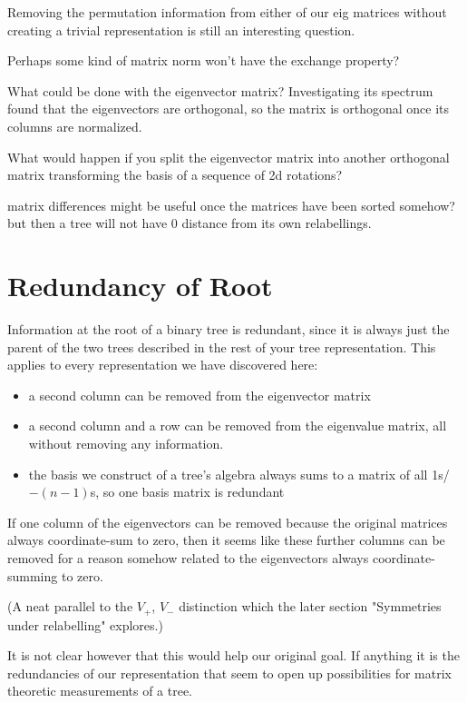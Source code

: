 \documentclass[10pt,a4paper]{report}
\begin{document}
Removing the permutation information from either of our eig matrices without creating a trivial representation is still an interesting question.

Perhaps some kind of matrix norm won't have the exchange property?

What could be done with the eigenvector matrix? Investigating its spectrum found that the eigenvectors are orthogonal, so the matrix is orthogonal once its columns are normalized.

What would happen if you split the eigenvector matrix into another orthogonal matrix transforming the basis of a sequence of 2d rotations?

matrix differences might be useful once the matrices have been sorted somehow? but then
a tree will not have 0 distance from its own relabellings.

\section{Redundancy of Root}

Information at the root of a binary tree is redundant, since it is always just the parent of the two trees described in the rest of your tree representation.
This applies to every representation we have discovered here:
\begin{itemize}
	\item a second column can be removed from the eigenvector matrix
	\item a second column and a row can be removed from the eigenvalue matrix, all without removing any information.
	\item the basis we construct of a tree's algebra always sums to a matrix of all 1s/$-(n-1)$s, so one basis matrix is redundant
\end{itemize}

If one column of the eigenvectors can be removed because the original matrices always coordinate-sum to zero, then it seems like these further columns can be removed for a reason somehow related to the eigenvectors always coordinate-summing to zero.

(A neat parallel to the $V_+$, $V_-$ distinction which the later section "Symmetries under relabelling" explores.)

It is not clear however that this would help our original goal. If anything it is the redundancies of our representation that seem to open up possibilities for matrix theoretic measurements of a tree.
\end{document}
